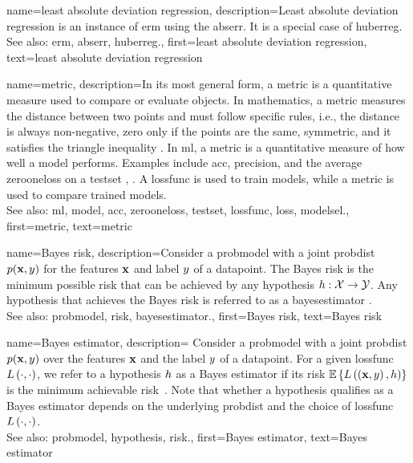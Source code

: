 {name={least absolute deviation regression},
 description={Least absolute deviation regression 
 	is an instance of \gls{erm} using the \gls{abserr}. It is a special case of \gls{huberreg}.
				\\
 See also: \gls{erm}, \gls{abserr}, \gls{huberreg}.},
 first={least absolute deviation regression},
 text={least absolute deviation regression}
}

{name={metric},
  description={In its most general form, a metric is a quantitative measure 
  		used to compare or evaluate objects. In mathematics, a metric measures the distance 
		between two points and must follow specific rules, i.e., the distance is always non-negative, 
		zero only if the points are the same, symmetric, and it satisfies the triangle inequality \cite{RudinBookPrinciplesMatheAnalysis}. 
		In \gls{ml}, a metric is a quantitative measure of how well a \gls{model} performs. Examples include \gls{acc}, 
		precision, and the average \gls{zerooneloss} on a \gls{testset} \cite{Goodfellow-et-al-2016}, \cite{BishopBook}. 
		A \gls{lossfunc} is used to train \glspl{model}, while a metric is used to compare trained \glspl{model}.
		\\ See also: \gls{ml}, \gls{model}, \gls{acc}, \gls{zerooneloss}, \gls{testset}, \gls{lossfunc}, \gls{loss}, \gls{modelsel}.},
	first={metric}, 
  text={metric}
 }

{name={Bayes risk},
 description={Consider a \gls{probmodel} with a joint \gls{probdist} $p({\bf x},y)$ for 
 	the \glspl{feature} ${\bf x}$ and \gls{label} $y$ of a \gls{datapoint}. The 
 	Bayes \gls{risk} is the \gls{minimum} possible \gls{risk} that can be achieved by any \gls{hypothesis} 
$h: \mathcal{X} \rightarrow \mathcal{Y}$. Any \gls{hypothesis} that achieves 
the Bayes \gls{risk} is referred to as a \gls{bayesestimator} \cite{LC}.
		\\
		See also: \gls{probmodel}, \gls{risk}, \gls{bayesestimator}.},
	first={Bayes risk},
	text={Bayes risk}
}
	
{name={Bayes estimator},
  description={
  	Consider a \gls{probmodel} with a joint \gls{probdist} 
  	$p({\bf x},y)$ over the \glspl{feature} ${\bf x}$ and the \gls{label} $y$ 
  	of a \gls{datapoint}. For a given \gls{lossfunc} $L\left(\cdot,\cdot \right)$, we refer to a \gls{hypothesis} 
  	$h$ as a Bayes estimator if its \gls{risk} 
  	$\mathbb{E}\left\{L\left(\left( {\bf x},y \right),h \right)\right\}$ 
  	is the \gls{minimum} achievable \gls{risk}~\cite{LC}. 
  	Note that whether a \gls{hypothesis} qualifies as a Bayes estimator depends on the underlying 
  	\gls{probdist} and the choice of \gls{lossfunc} $L\left(\cdot,\cdot \right)$.
		\\
		See also: \gls{probmodel},  \gls{hypothesis}, \gls{risk}.},
		first={Bayes estimator},
 	text={Bayes estimator}
}

